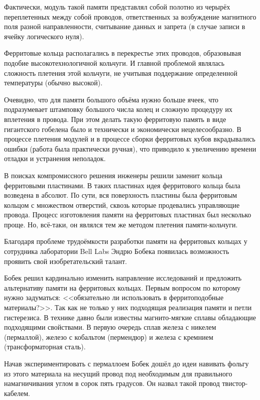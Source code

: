 Фактически, модуль такой памяти представлял собой полотно из черырёх 
переплетенных между собой проводов, ответственных за возбуждение 
магнитного поля разной направленности, считывание данных и запрета (в 
случае записи в ячейку логического нуля). 

Ферритовые кольца располагались в перекрестье этих проводов, образовывая 
подобие высокотехнологичной кольчуги. И главной проблемой являлась 
сложность плетения этой кольчуги, не учитывая поддержание определенной 
температуры (обычно высокой). 

Очевидно, что для памяти большого объёма 
нужно больше ячеек, что подразумевает штамповку большого числа колец и 
сложную процедуру их вплетения в провода. При этом делать такую ферритовую 
память в виде гигантского гобелена было и технически и экономически 
нецелесообразно. В процессе плетения модулей и в процессе сборки 
ферритовых кубов вкрадывались ошибки (работа была практически ручная), что 
приводило к увеличению времени отладки и устранения неполадок.

В поисках компромиссного решения инженеры решили заменит кольца 
ферритовыми пластинами. В таких пластинах идея ферритового кольца была 
возведена в абсолют. По сути, вся поверхность пластины была 
ферритовым кольцом с множеством отверстий, сквозь которые продевались 
управляющие провода. Процесс изготовления памяти на ферритовых 
пластинах был несколько проще. Но, всё-таки, он являлся тем же методом 
плетения памяти-кольчуги. 

Благодаря проблеме трудоёмкости разработки памяти на ферритовых кольцах 
у сотрудника лаборатории Bell Labs Эндрю Бобека появилась возможность 
проявить свой изобретательский талант.

Бобек решил кардинально изменить направление исследований и предложить 
альтернативу памяти на ферритовых кольцах. Первым вопросом по которому 
нужно задуматься: <<обязательно ли использовать в ферритоподобные 
материалы?>>. Так как не только у них подходящая реализация памяти и 
петли гистерезиса. В технике давно были известны магнито-мягкие сплавы 
обладающие подходящими свойствами. В первую очередь сплав железа с 
никелем (пермаллой), железо с кобальтом (пермендюр) и железа с кремнием 
(трансформаторная сталь).

Начав экспериментировать с пермаллоем Бобек дошёл до идеи навивать фольгу 
из этого материала на несущий провод под необходимым для правильного 
намагничивания углом в сорок пять градусов. Он назвал такой провод 
твистор-кабелем. 

